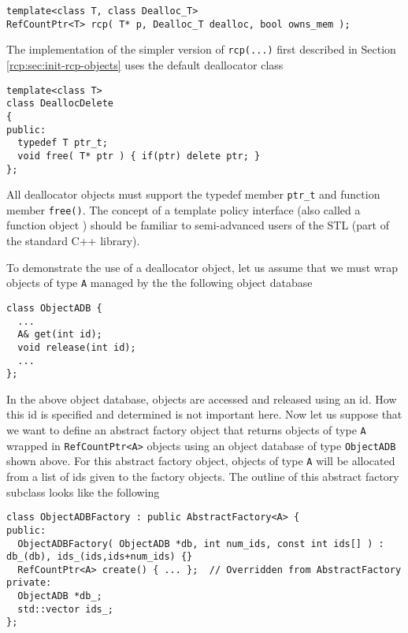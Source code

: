 {\scriptsize\begin{verbatim}
template<class T, class Dealloc_T>
RefCountPtr<T> rcp( T* p, Dealloc_T dealloc, bool owns_mem );
\end{verbatim}}

The implementation of the simpler version of {}\texttt{rcp(...)} first
described in Section {}\ref{rcp:sec:init-rcp-objects} uses the default
deallocator class

{\scriptsize\begin{verbatim}
template<class T>
class DeallocDelete
{
public:
  typedef T ptr_t;
  void free( T* ptr ) { if(ptr) delete ptr; }
};
\end{verbatim}}

All deallocator objects must support the typedef member
{}\texttt{ptr\_t} and function member {}\texttt{free()}.  The concept
of a template policy interface (also called a function object
\cite[Section 18.4]{ref:stroustrup_2000}) should be familiar to
semi-advanced users of the STL (part of the standard C++ library).

To demonstrate the use of a deallocator object, let us assume that we
must wrap objects of type {}\texttt{A} managed by the the following
object database

{\scriptsize\begin{verbatim}
class ObjectADB {
  ...
  A& get(int id);
  void release(int id);
  ...
};
\end{verbatim}}

In the above object database, objects are accessed and released using
an id.  How this id is specified and determined is not important here.
Now let us suppose that we want to define an abstract factory object
that returns objects of type {}\texttt{A} wrapped in
{}\texttt{RefCountPtr<A>} objects using an object database of type
{}\texttt{ObjectADB} shown above.  For this abstract factory object,
objects of type {}\texttt{A} will be allocated from a list of ids
given to the factory objects.  The outline of this abstract factory
subclass looks like the following

{\scriptsize\begin{verbatim}
class ObjectADBFactory : public AbstractFactory<A> {
public:
  ObjectADBFactory( ObjectADB *db, int num_ids, const int ids[] ) : db_(db), ids_(ids,ids+num_ids) {}
  RefCountPtr<A> create() { ... };  // Overridden from AbstractFactory
private:
  ObjectADB *db_;
  std::vector ids_;
};
\end{verbatim}}

